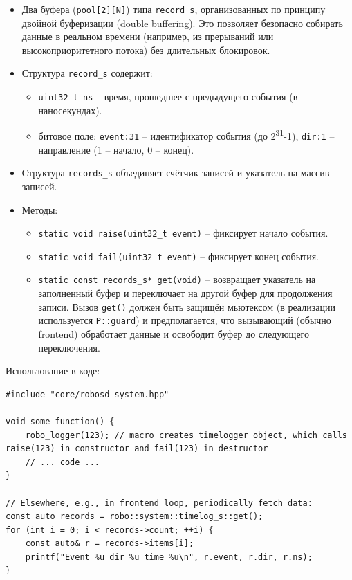 \documentclass[a4paper,12pt]{article}
\begin{document}
\begin{itemize}
    \item Два буфера (\texttt{pool[2][N]}) типа \texttt{record\_s}, организованных по принципу двойной буферизации (double buffering). Это позволяет безопасно собирать данные в реальном времени (например, из прерываний или высокоприоритетного потока) без длительных блокировок.
    \item Структура \texttt{record\_s} содержит:
        \begin{itemize}
            \item \texttt{uint32\_t ns} -- время, прошедшее с предыдущего события (в наносекундах).
            \item битовое поле: \texttt{event:31} -- идентификатор события (до 2\textsuperscript{31}-1), \texttt{dir:1} -- направление (1 -- начало, 0 -- конец).
        \end{itemize}
    \item Структура \texttt{records\_s} объединяет счётчик записей и указатель на массив записей.
    \item Методы:
        \begin{itemize}
            \item \texttt{static void raise(uint32\_t event)} -- фиксирует начало события.
            \item \texttt{static void fail(uint32\_t event)} -- фиксирует конец события.
            \item \texttt{static const records\_s* get(void)} -- возвращает указатель на заполненный буфер и переключает на другой буфер для продолжения записи. Вызов \texttt{get()} должен быть защищён мьютексом (в реализации используется \texttt{P::guard}) и предполагается, что вызывающий (обычно frontend) обработает данные и освободит буфер до следующего переключения.
        \end{itemize}
\end{itemize}

Использование в коде:

\begin{lstlisting}
#include "core/robosd_system.hpp"

void some_function() {
    robo_logger(123); // macro creates timelogger object, which calls raise(123) in constructor and fail(123) in destructor
    // ... code ...
}

// Elsewhere, e.g., in frontend loop, periodically fetch data:
const auto records = robo::system::timelog_s::get();
for (int i = 0; i < records->count; ++i) {
    const auto& r = records->items[i];
    printf("Event %u dir %u time %u\n", r.event, r.dir, r.ns);
}
\end{lstlisting}
\end{document}
